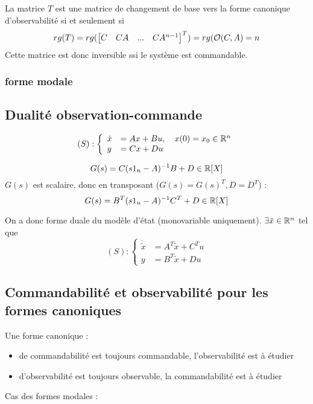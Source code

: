 \documentclass[main.tex]{subfiles}
\begin{document}
\begin{prop}
  La matrice $T$ est une matrice de changement de base vers la forme canonique d'observabilité si et seulement si
  \[
    rg(T) = rg(\begin{bmatrix} C& CA& ...&  CA^{n-1} \end{bmatrix}^T) =rg(\mathcal{O}(C,A) = n
  \]
  Cette matrice est donc inversible ssi le système est commandable.
\end{prop}


\subsubsection{forme modale}


\subsection{Dualité observation-commande}
\[ (S) :
\left\{
\begin{array}{ll}
\dot{x} &= Ax + Bu, \quad x(0)=x_0 \in \mathbb{R}^n \\
y & = Cx+Du
\end{array}
\right.
\]

\[G(s) = C(s1_n-A)^{-1}B+D \in \mathbb{R}[X]\]
$G(s)$ est scalaire, donc en transposant ($G(s)=G(s)^T, D=D^T$) :
\[G(s) = B^T(s1_n-A)^{-1}C^T+D \in \mathbb{R}[X]\]
\begin{defin}
On a donc  forme duale du modèle d'état (monovariable uniquement).
$\exists \tilde{x}\in \mathbb{R}^n$ tel que
\[ (S) :
\left\{
\begin{array}{ll}
\dot{\tilde{x}} &= A^T\tilde{x} + C^Tu \\
y & = B^T\tilde{x}+Du
\end{array}
\right.
\]

\end{defin}
\subsection{Commandabilité et observabilité pour les formes canoniques}

Une forme canonique :
\begin{itemize}
\item de commandabilité est toujours commandable, l'observabilité est à étudier
\item d'observabilité est toujours observable, la commandabilité est à étudier\\
\end{itemize}


Cas des formes modales :
\end{document}
